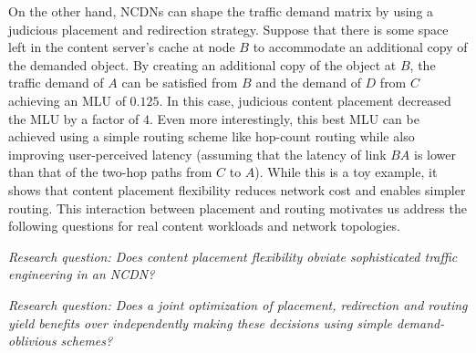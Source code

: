 On the other hand, NCDNs can shape the traffic demand matrix by using a judicious placement and redirection strategy. Suppose that there is some space left in the content server's cache at node $B$ to accommodate an additional copy of the demanded object. By creating an additional copy of the object at $B$, the traffic demand of $A$ can be satisfied from $B$ and the demand of $D$ from $C$ achieving an MLU of $0.125$. In this case, judicious content placement decreased the MLU by a factor of $4$. Even more interestingly, this best MLU can be achieved using a simple routing scheme like hop-count routing while also improving user-perceived latency (assuming that the latency of link $BA$ is lower than that of the two-hop paths from $C$ to $A$). While this is a toy example, it shows that content placement flexibility reduces network cost and enables simpler routing. This interaction between placement and routing motivates us address the following questions for real content workloads and network topologies. 

\emph{Research question: Does content placement flexibility obviate sophisticated traffic engineering in an NCDN?}

\emph{Research question: Does a joint optimization of placement, redirection and routing yield benefits over independently making these decisions using simple demand-oblivious schemes?}



%
%





